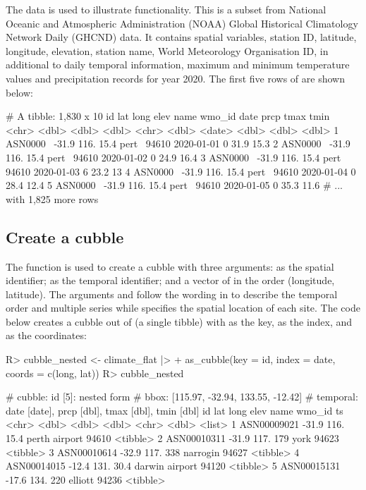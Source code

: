 \documentclass[
]{jss}
\begin{document}
The data  is used to illustrate  functionality. This is a subset from National Oceanic and Atmospheric Administration (NOAA) Global Historical Climatology Network Daily (GHCND) data. It contains spatial variables, station ID, latitude, longitude, elevation, station name, World Meteorology Organisation ID, in additional to daily temporal information, maximum and minimum temperature values and precipitation records for year 2020. The first five rows of  are shown below:

\begin{CodeChunk}
\begin{CodeOutput}
# A tibble: 1,830 x 10
  id         lat  long  elev name  wmo_id date        prcp  tmax  tmin
  <chr>    <dbl> <dbl> <dbl> <chr>  <dbl> <date>     <dbl> <dbl> <dbl>
1 ASN0000~ -31.9  116.  15.4 pert~  94610 2020-01-01     0  31.9  15.3
2 ASN0000~ -31.9  116.  15.4 pert~  94610 2020-01-02     0  24.9  16.4
3 ASN0000~ -31.9  116.  15.4 pert~  94610 2020-01-03     6  23.2  13  
4 ASN0000~ -31.9  116.  15.4 pert~  94610 2020-01-04     0  28.4  12.4
5 ASN0000~ -31.9  116.  15.4 pert~  94610 2020-01-05     0  35.3  11.6
# ... with 1,825 more rows
\end{CodeOutput}
\end{CodeChunk}

\hypertarget{create}{%
\subsection{Create a cubble}\label{create}}

The function  is used to create a cubble with three arguments:  as the spatial identifier;  as the temporal identifier; and a vector of  in the order (longitude, latitude). The arguments  and  follow the wording in  to describe the temporal order and multiple series while  specifies the spatial location of each site. The code below creates a cubble out of  (a single tibble) with  as the key,  as the index, and  as the coordinates:

\begin{CodeChunk}
\begin{CodeInput}
R> cubble_nested <- climate_flat |>
+   as_cubble(key = id, index = date, coords = c(long, lat))
R> cubble_nested
\end{CodeInput}
\begin{CodeOutput}
# cubble:   id [5]: nested form
# bbox:     [115.97, -32.94, 133.55, -12.42]
# temporal: date [date], prcp [dbl], tmax [dbl], tmin [dbl]
  id            lat  long  elev name           wmo_id ts      
  <chr>       <dbl> <dbl> <dbl> <chr>           <dbl> <list>  
1 ASN00009021 -31.9  116.  15.4 perth airport   94610 <tibble>
2 ASN00010311 -31.9  117. 179   york            94623 <tibble>
3 ASN00010614 -32.9  117. 338   narrogin        94627 <tibble>
4 ASN00014015 -12.4  131.  30.4 darwin airport  94120 <tibble>
5 ASN00015131 -17.6  134. 220   elliott         94236 <tibble>
\end{CodeOutput}
\end{CodeChunk}
\end{document}
